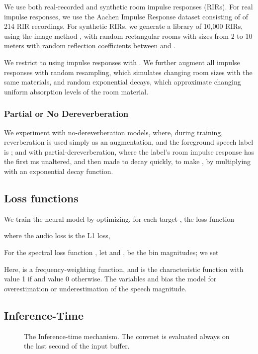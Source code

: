 \documentclass[english]{article}
\begin{document}
We use both real-recorded and synthetic room impulse responses (RIRs). For real impulse responses, we use the Aachen Impulse Response dataset \cite{jeub2009binaural} consisting of of 214 RIR recordings. For synthetic RIRs, we generate a library of 10,000 RIRs, using the image method \cite{allen1979image}, with random rectangular rooms with sizes from 2 to 10 meters with random reflection coefficients between  and .

We restrict to using impulse responses with . We further augment all impulse responses with random resampling, which simulates changing room sizes with the same materials, and random exponential decays, which approximate changing uniform absorption levels of the room material. 

\subsubsection{Partial or No Dereverberation} We experiment with no-dereverberation models, where, during training, reverberation is used simply as an augmentation, and the foreground speech label is ; and with partial-dereverberation, where the label's room impulse response has the first ms unaltered, and then made to decay quickly, to make , by multiplying with an exponential decay function.


\subsection{Loss functions}

We train the neural model by optimizing, for each target , the loss function

where the audio loss is the L1 loss,
 
For the spectral loss function , let  and , be the  bin magnitudes; we set

Here,  is a frequency-weighting function, and  is the characteristic function with value 1 if  and value 0 otherwise. The variables  and  bias the model for overestimation or underestimation of the speech magnitude. 


\subsection{Inference-Time} 

\begin{figure}[htb!]
    \caption{The Inference-time mechanism. The convnet is evaluated always on the last second of the input buffer. }
\label{figinference}
\end{figure}
\end{document}
